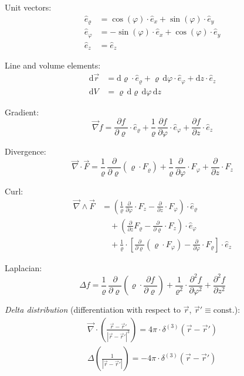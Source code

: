 \documentclass[fontsize=11pt,a4paper]{scrartcl}
\begin{document}
Unit vectors:
\begin{align*}
	\hat e_\varrho &= \cos(\varphi)\cdot\hat e_x + \sin(\varphi)\cdot\hat e_y\\
	\hat e_\varphi &= -\sin(\varphi)\cdot\hat e_x + \cos(\varphi)\cdot\hat e_y\\
	\hat e_z &= \hat e_z
\end{align*}

Line and volume elements:
\begin{align*}
	\mathrm{d}\vec r &= \mathrm{d}\varrho\cdot\hat e_\varrho + \varrho\,\mathrm{d}\varphi\cdot\hat e_\varphi + \mathrm{d}z\cdot\hat e_z\\
	\mathrm{d}V &= \varrho\,\mathrm{d}\varrho\,\mathrm{d}\varphi\,\mathrm{d}z
\end{align*}

Gradient:
\[
	\vec\nabla f = \frac{\partial f}{\partial\varrho}\cdot\hat e_\varrho + \frac{1}{\varrho}\,\frac{\partial f}{\partial\varphi}\cdot\hat e_\varphi
	               + \frac{\partial f}{\partial z}\cdot\hat e_z
\]

Divergence:
\[
	\vec\nabla\cdot\vec F = \frac{1}{\varrho}\,\frac{\partial}{\partial\varrho}(\varrho\cdot F_\varrho)
	                        + \frac{1}{\varrho}\,\frac{\partial}{\partial\varphi}\cdot F_\varphi + \frac{\partial}{\partial z}\cdot F_z
\]

Curl:
\begin{equation*}
\begin{split}
	\vec\nabla\wedge\vec F &= \left(\frac{1}{\varrho}\,\frac{\partial}{\partial\varphi}\cdot F_z-\frac{\partial}{\partial z}\cdot F_\varphi\right)\cdot\hat e_\varrho\\
	                       &\quad+ \left(\frac{\partial}{\partial z}F_\varrho-\frac{\partial}{\partial\varrho}\cdot F_z\right)\cdot\hat e_\varphi\\
	                       &\quad+ \frac{1}{\varrho}\cdot\left[\frac{\partial}{\partial\varrho}(\varrho\cdot F_\varphi)-\frac{\partial}{\partial\varphi}\cdot
	                               F_\varrho\right]\cdot\hat e_z
\end{split}
\end{equation*}

Laplacian:
\[
	\Delta f = \frac{1}{\varrho}\,\frac{\partial}{\partial\varrho}\left(\varrho\cdot\frac{\partial f}{\partial\varrho}\right)
	           + \frac{1}{\varrho^2}\cdot\frac{\partial^2 f}{\partial\varphi^2} + \frac{\partial^2 f}{\partial z^2}
\]

\emph{Delta distribution} (differentiation with respect to $\vec r$, $\vec r'\equiv\text{const.}$):
\begin{gather*}
	\vec\nabla\cdot\left(\frac{\vec r-\vec r'}{|\vec r-\vec r'|^3}\right) = 4\pi\cdot\delta^{(3)}(\vec r-\vec r')\\
	\Delta\left(\frac{1}{|\vec r-\vec r'|}\right) = -4\pi\cdot\delta^{(3)}(\vec r-\vec r')
\end{gather*}
\end{document}
